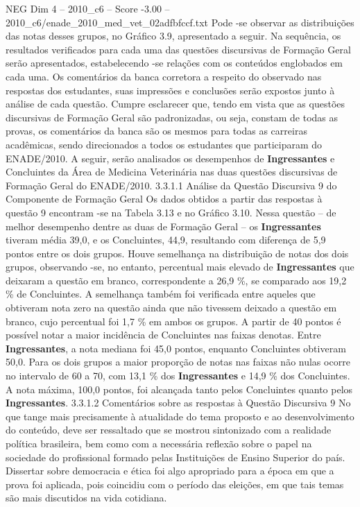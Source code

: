 \begin{textsample}{NEG Dim 4 – 2010\_c6 – Score -3.00 – 2010\_c6/enade\_2010\_med\_vet\_02adfbfccf.txt}
Pode -se observar as distribuições das notas desses grupos, no Gráfico 3.9, apresentado a seguir.
Na sequência, os resultados verificados para cada uma das questões discursivas de Formação Geral serão apresentados, estabelecendo -se relações com os conteúdos englobados em cada uma.
Os comentários da banca corretora a respeito do observado nas respostas dos estudantes, suas impressões e conclusões serão expostos junto à análise de cada questão.
Cumpre esclarecer que, tendo em vista que as questões discursivas de Formação Geral são padronizadas, ou seja, constam de todas as provas, os comentários da banca são os mesmos para todas as carreiras acadêmicas, sendo direcionados a todos os estudantes que participaram do ENADE/2010.
A seguir, serão analisados os desempenhos de \textbf{Ingressantes} e Concluintes da Área de Medicina Veterinária nas duas questões discursivas de Formação Geral do ENADE/2010. 3.3.1.1 Análise da Questão Discursiva 9 do Componente de Formação Geral Os dados obtidos a partir das respostas à questão 9 encontram -se na Tabela 3.13 e no Gráfico 3.10.
Nessa questão – de melhor desempenho dentre as duas de Formação Geral – os \textbf{Ingressantes} tiveram média 39,0, e os Concluintes, 44,9, resultando com diferença de 5,9 pontos entre os dois grupos.
Houve semelhança na distribuição de notas dos dois grupos, observando -se, no entanto, percentual mais elevado de \textbf{Ingressantes} que deixaram a questão em branco, correspondente a 26,9 \%, se comparado aos 19,2 \% de Concluintes.
A semelhança também foi verificada entre aqueles que obtiveram nota zero na questão ainda que não tivessem deixado a questão em branco, cujo percentual foi 1,7 \% em ambos os grupos.
A partir de 40 pontos é possível notar a maior incidência de Concluintes nas faixas denotas.
Entre \textbf{Ingressantes}, a nota mediana foi 45,0 pontos, enquanto Concluintes obtiveram 50,0.
Para os dois grupos a maior proporção de notas nas faixas não nulas ocorre no intervalo de 60 a 70, com 13,1 \% dos \textbf{Ingressantes} e 14,9 \% dos Concluintes.
A nota máxima, 100,0 pontos, foi alcançada tanto pelos Concluintes quanto pelos \textbf{Ingressantes}. 3.3.1.2 Comentários sobre as respostas à Questão Discursiva 9 No que tange mais precisamente à atualidade do tema proposto e ao desenvolvimento do conteúdo, deve ser ressaltado que se mostrou sintonizado com a realidade política brasileira, bem como com a necessária reflexão sobre o papel na sociedade do profissional formado pelas Instituições de Ensino Superior do país.
Dissertar sobre democracia e ética foi algo apropriado para a época em que a prova foi aplicada, pois coincidiu com o período das eleições, em que tais temas são mais discutidos na vida cotidiana.

\end{textsample}
